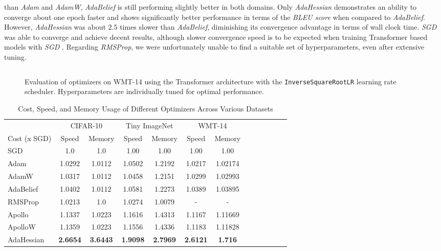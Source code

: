 than \emph{Adam} and \emph{AdamW}, \emph{AdaBelief} is still performing slightly better in both domains. Only \emph{AdaHessian} demonstrates an ability to converge about one epoch faster
and shows significantly better performance in terms of the \emph{BLEU score} when compared to \emph{AdaBelief}. However, \emph{AdaHessian} was about $2.5$ times slower than \emph{AdaBelief},
diminishing its convergence advantage in terms of wall clock time.
\emph{SGD} was able to converge and achieve decent results, although slower convergence speed is to be expected when training Transformer
based models with \emph{SGD} \cite{dao2020understanding}.
Regarding \emph{RMSProp}, we were unfortunately unable to find a suitable set of hyperparameters, even after extensive tuning.

\begin{figure}[h!]
    \centering
    \begin{tabular}{cc}
         \\ %
        
    \end{tabular}
    \caption{Evaluation of optimizers on WMT-14 using the Transformer architecture with the \texttt{InverseSquareRootLR} learning rate scheduler.
    Hyperparameters are individually tuned for optimal performance.}
    \label{fig:wmt14-perf-opt}
\end{figure}

\begin{table}[h!]
    \centering
    \caption{Cost, Speed, and Memory Usage of Different Optimizers Across Various Datasets}
    \label{tab:optimizer_comparison_perf}
    \begin{tabular}{lcccccccccccc}
        \toprule
        & \multicolumn{2}{c}{CIFAR-10} & \multicolumn{2}{c}{Tiny ImageNet}  & \multicolumn{2}{c}{WMT-14} \\
        \cmidrule(lr){2-3} \cmidrule(lr){4-5}  \cmidrule(lr){6-7} 
        Cost (x SGD) & Speed & Memory  & Speed & Memory  & Speed & Memory  \\
        \midrule
        SGD         & 1.0 & 1.0 & 1.00 & 1.00 & 1.00 & 1.00  \\
        Adam        & 1.0292 & 1.0112 & 1.0502 & 1.2192& 1.0217 & 1.02174 \\
        AdamW       & 1.0317 & 1.0112 & 1.0458& 1.2151 &  1.0299 & 1.02993 \\
        AdaBelief   & 1.0402 & 1.0112 & 1.0581 & 1.2273 & 1.0389 & 1.03895 \\
        RMSProp     & 1.0213 & 1.0 & 1.0274 & 1.0079 & - & - \\
        Apollo      & 1.1337 & 1.0223 & 1.1616 & 1.4313 & 1.1167 & 1.11669  \\
        ApolloW     & 1.1359 & 1.0223 & 1.1556 & 1.4336 & 1.1183& 1.11828   \\
        AdaHessian  & \textbf{2.6654} &\textbf{3.6443}& \textbf{1.9098}  & \textbf{2.7969} & \textbf{2.6121} &\textbf{1.716}\\
        \bottomrule
    \end{tabular}
\end{table}




